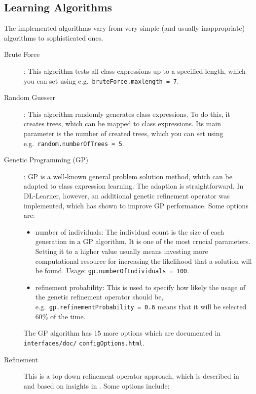 \documentclass[a4paper,12pt]{scrartcl}
\begin{document}
\subsection{Learning Algorithms}

The implemented algorithms vary from very simple (and usually inappropriate) algorithms to sophisticated ones. 

\begin{description}
 \item[Brute Force]: This algorithm tests all class expressions up to a specified length, which you can set using e.g.~\verb|bruteForce.maxlength = 7|.
 \item[Random Guesser]: This algorithm randomly generates class expressions. To do this, it creates trees, which can be mapped to class expressions. Its main parameter is the number of created trees, which you can set using e.g.~\verb|random.numberOfTrees = 5|.
 \item[Genetic Programming (GP)]: GP is a well-known general problem solution method, which can be adapted to class expression learning. The adaption is straightforward. In DL-Learner, however, an additional genetic refinement operator was implemented, which has shown to improve GP performance\cite{hybrid_gp}. Some options are:
 \begin{itemize}
  \item number of individuals: The individual count is the size of each generation in a GP algorithm. It is one of the most crucial parameters. Setting it to a higher value usually means investing more computational resource for increasing the likelihood that a solution will be found. Usage: \verb|gp.numberOfIndividuals = 100|.
  \item refinement probability: This is used to specify how likely the usage of the genetic refinement operator should be, e.g.~\verb|gp.refinementProbability = 0.6| means that it will be selected 60\% of the time.
 \end{itemize}
 The GP algorithm has 15 more options which are documented in \verb|interfaces/doc/| \verb|configOptions.html|. %
 \item[Refinement] This is a top down refinement operator approach, which is described in \cite{alc_learning_algorithm} and based on insights in \cite{property_analysis}. Some options include:

\end{description}
\end{document}
